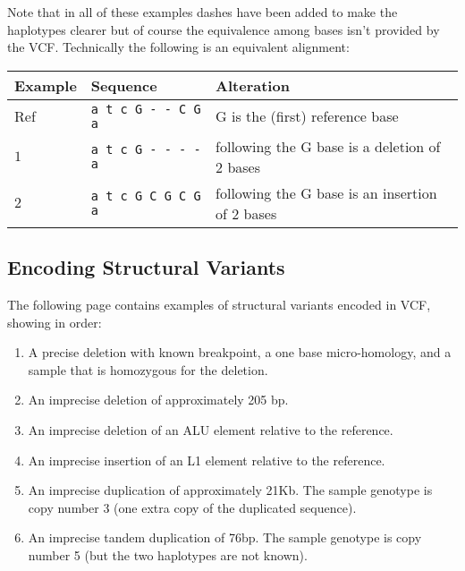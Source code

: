 \documentclass[8pt]{article}
\begin{document}
Note that in all of these examples dashes have been added to make the haplotypes clearer but of course the equivalence among bases isn't provided by the VCF.
Technically the following is an equivalent alignment:

\vspace{0.3cm}
\begin{tabular}{ | l | l | l | }
\hline
Example & Sequence & Alteration \\ \hline
Ref & \verb|a t c G - - C G a| & G is the (first) reference base \\ \hline
$1$ & \verb|a t c G - - - - a| & following the G base is a deletion of 2 bases \\ \hline
$2$ & \verb|a t c G C G C G a| & following the G base is an insertion of 2 bases \\ \hline
\end{tabular}

\subsection{Encoding Structural Variants}
The following page contains examples of structural variants encoded in VCF, showing in order:
\begin{enumerate}
  \item A precise deletion with known breakpoint, a one base micro-homology, and a sample that is homozygous for the deletion.
  \item An imprecise deletion of approximately 205 bp.
  \item An imprecise deletion of an ALU element relative to the reference.
  \item An imprecise insertion of an L1 element relative to the reference.
  \item An imprecise duplication of approximately 21Kb. The sample genotype is copy number 3 (one extra copy of the duplicated sequence).
  \item An imprecise tandem duplication of 76bp. The sample genotype is copy number 5 (but the two haplotypes are not known).
\end{enumerate}
\end{document}
